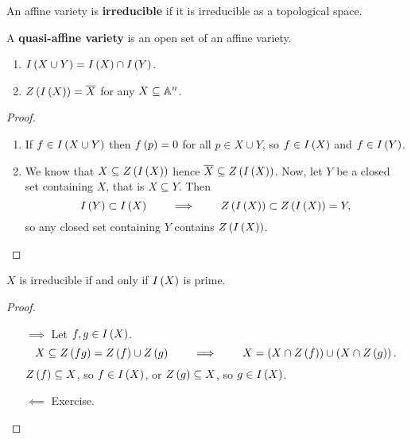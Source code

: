 \begin{definition}
An affine variety is \textbf{irreducible} if it is irreducible as a topological space.
\end{definition}

\begin{remark}
A \textbf{quasi-affine variety} is an open set of an affine variety.
\end{remark}

\begin{proposition}
\hfill
\begin{enumerate}
\item $ I\left( X \cup Y \right) = I\left( X \right) \cap I\left( Y \right) $.
\item $ Z\left( I\left( X \right) \right) = \overline{X} $ for any $ X \subseteq \mathbb{A}^n $.
\end{enumerate}
\end{proposition}

\begin{proof}
\hfill
\begin{enumerate}
\item If $ f \in I\left( X \cup Y \right) $ then $ f\left( p \right) = 0 $ for all $ p \in X \cup Y $, so $ f \in I\left( X \right) $ and $ f \in I\left( Y \right) $.
\item We know that $ X \subseteq Z\left( I\left( X \right) \right) $ hence $ \overline{X} \subseteq Z\left( I\left( X \right) \right) $. Now, let $ Y $ be a closed set containing $ X $, that is $ X \subseteq Y $. Then
$$ I\left( Y \right) \subset I\left( X \right) \qquad \implies \qquad Z\left( I\left( X \right) \right) \subset Z\left( I\left( X \right) \right) = Y, $$
so any closed set containing $ Y $ contains $ Z\left( I\left( X \right) \right) $.
\end{enumerate}
\end{proof}

\begin{proposition}
$ X $ is irreducible if and only if $ I\left( X \right) $ is prime.
\end{proposition}

\begin{proof}
\hfill
\begin{itemize}
\item[$ \implies $] Let $ f, g \in I\left( X \right) $.
$$ X \subseteq Z\left( fg \right) = Z\left( f \right) \cup Z\left( g \right) \qquad \implies \qquad X = \left( X \cap Z\left( f \right) \right) \cup \left( X \cap Z\left( g \right) \right). $$
$ Z\left( f \right) \subseteq X $, so $ f \in I\left( X \right) $, or $ Z\left( g \right) \subseteq X $, so $ g \in I\left( X \right) $.
\item[$ \impliedby $] Exercise.
\end{itemize}
\end{proof}

